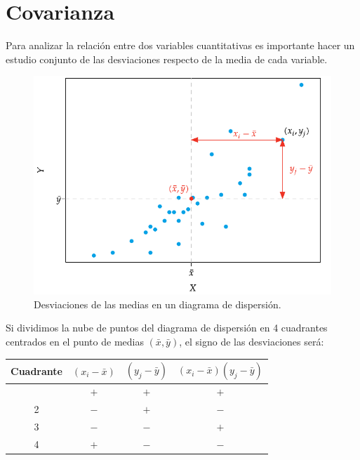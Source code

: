 \documentclass[
  a4paper,
]{scrreport}
\theoremstyle{plain}
\theoremstyle{definition}
\theoremstyle{definition}
\theoremstyle{remark}
\begin{document}
\section{Covarianza}\label{covarianza}

Para analizar la relación entre dos variables cuantitativas es
importante hacer un estudio conjunto de las desviaciones respecto de la
media de cada variable.

\begin{figure}[H]

{\centering \includegraphics{img/regresion/desviaciones_media.pdf}

}

\caption{Desviaciones de las medias en un diagrama de dispersión.}

\end{figure}%

Si dividimos la nube de puntos del diagrama de dispersión en 4
cuadrantes centrados en el punto de medias \((\bar x, \bar y)\), el
signo de las desviaciones será:

\begin{longtable}[]{@{}cccc@{}}
\toprule\noalign{}
\textbf{Cuadrante} & \((x_i-\bar x)\) & \((y_j-\bar y)\) &
\((x_i-\bar x)(y_j-\bar y)\) \\
\midrule\noalign{}
\endhead
\bottomrule\noalign{}
\endlastfoot
1 & \(+\) & \(+\) & \(+\) \\
2 & \(-\) & \(+\) & \(-\) \\
3 & \(-\) & \(-\) & \(+\) \\
4 & \(+\) & \(-\) & \(-\) \\
\end{longtable}
\end{document}
